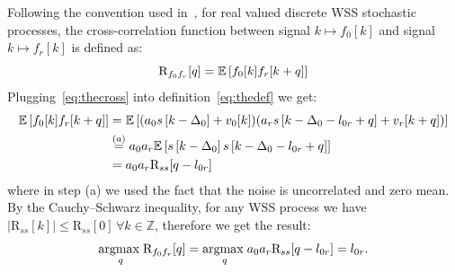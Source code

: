 \noindent
Following the convention used in~\cite{wiki:Cross-correlation}, for real valued discrete WSS stochastic processes, the cross-correlation function between signal \(k\mapsto f_0[k]\) and signal \(k\mapsto f_r[k]\) is defined as:
\begin{equation}
\mathrm{R}_{f_0f_r}[q]=\mathbb{E}\left[{f_0[k]f_r[k+q]}\right]
\label{eq:thedef}
\end{equation}
Plugging~\eqref{eq:thecross} into definition~\eqref{eq:thedef} we get:
\begin{equation}
\begin{aligned}
\mathbb{E}\left[{f_0[k]f_r[k+q]}\right]
& =
\mathbb{E}\left[{(a_{0} s\left[k-\Delta_0\right]+v_{0}[k])(a_{r} s\left[k-\Delta_0-l_{0r}+q\right]+v_{r}[k+q])}\right]\\
& \overset{(a)}{=}
a_{0}a_{r}\mathbb{E}\left[{s\left[k-\Delta_0\right]s\left[k-\Delta_0-l_{0r}+q\right]}\right]\\
& = a_{0}a_{r}\mathrm{R}_{ss}[q-l_{0r}]
\end{aligned}
\end{equation}
where in step (a) we used the fact that the noise is uncorrelated and zero mean. By the Cauchy–Schwarz inequality, for any WSS process we have \(|\mathrm{R}_{ss}[k]|\leq \mathrm{R}_{ss}[0]\,\forall k\in\mathbb{Z}\), therefore we get the result:
\begin{equation}
\underset{q}{\operatorname*{argmax\;}} \mathrm{R}_{f_0f_r}[q]
=\underset{q}{\operatorname*{argmax\;}}a_{0}a_{r}\mathrm{R}_{ss}[q-l_{0r}]
=l_{0r}.
\label{eq:basedon}
\end{equation}

